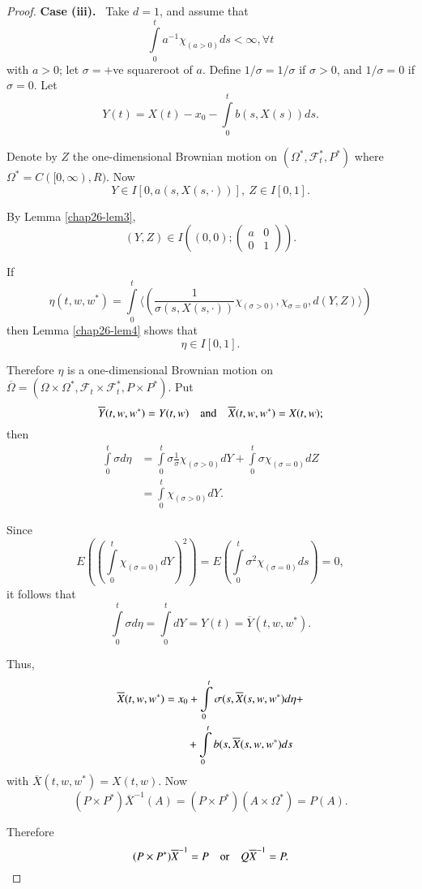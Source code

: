\begin{proof}
\medskip
\noindent
{\bf Case (iii).}~ Take $d=1$, and assume that
$$
\int\limits^{t}_{0}a^{-1}\chi_{(a>0)}ds<\infty,\forall t
$$
with $a>0$; let $\sigma=+$ve squareroot of $a$. Define
$1/\sigma=1/\sigma$ if $\sigma>0$, and $1/\sigma=0$ if $\sigma=0$. Let
$$
Y(t)=X(t)-x_{0}-\int\limits^{t}_{0}b(s,X(s))ds.
$$

Denote by $Z$ the one-dimensional Brownian motion on
$(\Omega^{*},\mathscr{F}^{*}_{t},P^{*})$ where
$\Omega^{*}=C([0,\infty),R)$. Now
$$
Y\in I[0,a(s,X(s,\cdot))],\ Z \in I[0,1].
$$

By Lemma \ref{chap26-lem3},
$$
(Y,Z)\in I\left((0,0);
\begin{pmatrix}
a & 0\\
0 & 1
\end{pmatrix}
\right).
$$

If
$$
\eta(t,w,w^{*})=\int\limits^{t}_{0}\langle
\left(\frac{1}{\sigma(s,X(s,\cdot))}\chi_{(\sigma>0)},\chi_{\sigma=0},d(Y,Z)\rangle\right) 
$$
then Lemma \ref{chap26-lem4} shows that
$$
\eta \in I[0,1].
$$

Therefore $\eta$ is a one-dimensional Brownian motion on
$\overline{\Omega}=(\Omega\times \Omega^{*},\mathscr{F}_{t}\times
\mathscr{F}^{*}_{t},P\times P^{*})$. Put
$$
\overline{Y}(t,w,w^{*})=Y(t,w)\quad\text{and}\quad
\overline{X}(t,w,w^{*})=X(t,w); 
$$
then\pageoriginale
\begin{align*}
\int\limits^{t}_{0}\sigma d\eta &=
\int\limits^{t}_{0}\sigma\frac{1}{\sigma}\chi_{(\sigma>0)}dY+\int\limits^{t}_{0}\sigma\chi_{(\sigma=0)}dZ\\
&= \int\limits^{t}_{0}\chi_{(\sigma>0)}dY.
\end{align*}

Since
$$
E\left(\left(\int\limits^{t}_{0}\chi_{(\sigma=0)}dY\right)^{2}\right)=E\left(\int\limits^{t}_{0}\sigma^{2}\chi_{(\sigma=0)}ds\right)=0, 
$$
it follows that
$$
\int\limits^{t}_{0}\sigma
d\eta=\int\limits^{t}_{0}dY=Y(t)=\overline{Y}(t,w,w^{*}). 
$$

Thus,
\begin{align*}
\overline{X}(t,w,w^{*}) &=
x_{0}+\int\limits^{t}_{0}\sigma(s,\overline{X}(s,w,w^{*})d\eta+\\ 
&\qquad +\int\limits^{t}_{0}b(s,\overline{X}(s,w,w^{*})ds 
\end{align*}
with $\overline{X}(t,w,w^{*})=X(t,w)$. Now
$$
(P\times P^{*})\overline{X}^{-1}(A)=(P\times P^{*})(A\times
\Omega^{*})=P(A). 
$$

Therefore
$$
(P\times P^{*})\overline{X}^{-1}=P\quad\text{or}\quad Q\overline{X}^{-1}=P.
$$


\end{proof}
